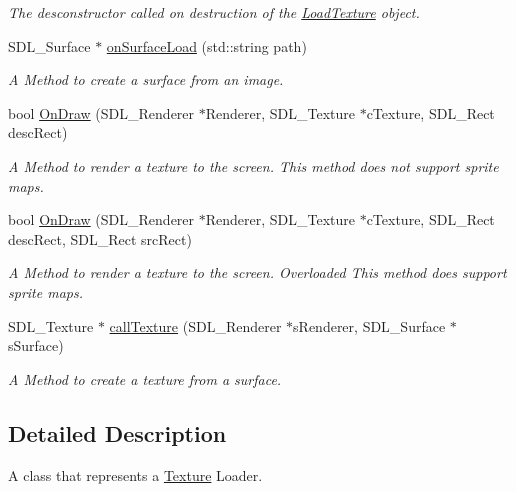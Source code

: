 \begin{DoxyCompactItemize}
\begin{DoxyCompactList}\small\item\em The desconstructor called on destruction of the \hyperlink{class_load_texture}{Load\+Texture} object. \end{DoxyCompactList}\item 
S\+D\+L\+\_\+\+Surface $\ast$ \hyperlink{class_load_texture_a632390c1083afa8ea209c6b5af2168a7}{on\+Surface\+Load} (std\+::string path)
\begin{DoxyCompactList}\small\item\em A Method to create a surface from an image. \end{DoxyCompactList}\item 
bool \hyperlink{class_load_texture_ab7d4e690623f00a1841b7d612153a4c0}{On\+Draw} (S\+D\+L\+\_\+\+Renderer $\ast$Renderer, S\+D\+L\+\_\+\+Texture $\ast$c\+Texture, S\+D\+L\+\_\+\+Rect desc\+Rect)
\begin{DoxyCompactList}\small\item\em A Method to render a texture to the screen. This method does not support sprite maps. \end{DoxyCompactList}\item 
bool \hyperlink{class_load_texture_a4b2e9d91b8a7832e3bcf86766bba6f45}{On\+Draw} (S\+D\+L\+\_\+\+Renderer $\ast$Renderer, S\+D\+L\+\_\+\+Texture $\ast$c\+Texture, S\+D\+L\+\_\+\+Rect desc\+Rect, S\+D\+L\+\_\+\+Rect src\+Rect)
\begin{DoxyCompactList}\small\item\em A Method to render a texture to the screen. Overloaded This method does support sprite maps. \end{DoxyCompactList}\item 
S\+D\+L\+\_\+\+Texture $\ast$ \hyperlink{class_load_texture_aae38c33f75a5cd1f7e7ef4452be6b9bf}{call\+Texture} (S\+D\+L\+\_\+\+Renderer $\ast$s\+Renderer, S\+D\+L\+\_\+\+Surface $\ast$s\+Surface)
\begin{DoxyCompactList}\small\item\em A Method to create a texture from a surface. \end{DoxyCompactList}\end{DoxyCompactItemize}


\subsection{Detailed Description}
A class that represents a \hyperlink{class_texture}{Texture} Loader. 

